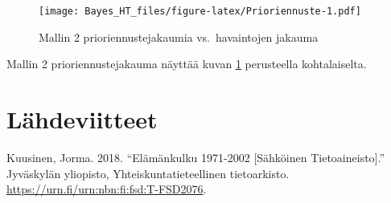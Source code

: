 \documentclass[
]{article}
\newlength{\cslhangindent}
\newenvironment{CSLReferences}[2] %
 {\begin{list}{}{%
  \setlength{\itemindent}{0pt}
  \setlength{\leftmargin}{0pt}
  \setlength{\parsep}{0pt}
  \ifodd #1
   \setlength{\leftmargin}{\cslhangindent}
   \setlength{\itemindent}{-1\cslhangindent}
  \fi
  \setlength{\itemsep}{#2\baselineskip}}}
 {\end{list}}
\begin{document}
\begin{figure}
\centering
\texttt{[image: Bayes\_HT\_files/figure-latex/Prioriennuste-1.pdf]}
\caption{\label{fig:Prioriennuste}Mallin 2 prioriennustejakaumia vs.~havaintojen jakauma}
\end{figure}

Mallin 2 prioriennustejakauma näyttää kuvan \ref{fig:Prioriennuste} perusteella kohtalaiselta.

\section*{Lähdeviitteet}\label{luxe4hdeviitteet}

\label{refs}
\begin{CSLReferences}{1}{0}
Kuusinen, Jorma. 2018. {``Elämänkulku 1971-2002 {[}Sähköinen Tietoaineisto{]}.''} Jyväskylän yliopisto, Yhteiskuntatieteellinen tietoarkisto. \url{https://urn.fi/urn:nbn:fi:fsd:T-FSD2076}.

\end{CSLReferences}
\end{document}
